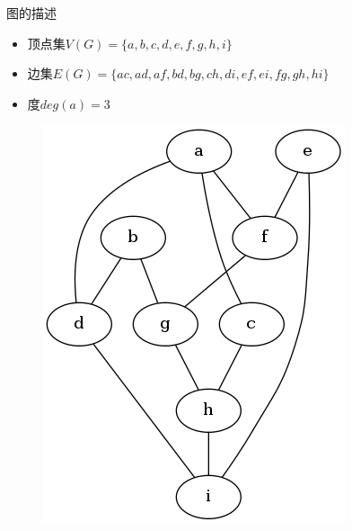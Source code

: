 \documentclass[UTF8]{ctexbeamer}
\begin{document}
\begin{frame}{图的描述}
  \begin{itemize}
  \item 顶点集$V(G) = \{a, b, c, d, e, f, g, h, i\}$
  \item 边集$E(G) = \{ac, ad, af, bd, bg, ch, di, ef, ei, fg, gh, hi\}$
  \item 度$deg(a) = 3$
  \end{itemize}

  \begin{figure}
    \centering
    \includegraphics[height=.4\textheight{}]{graph.png}
  \end{figure}

\end{frame}
\end{document}
